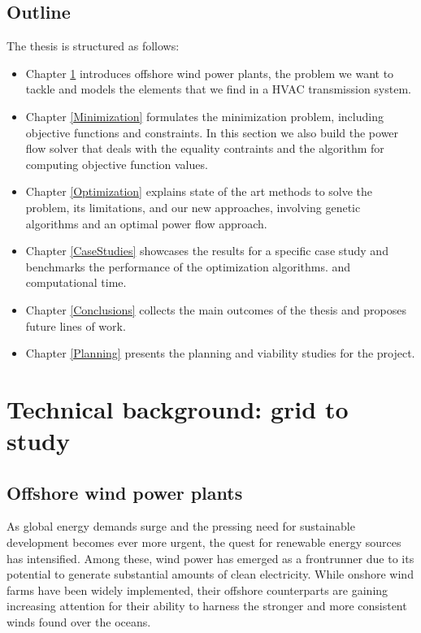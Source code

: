 \documentclass[a4paper,11pt, titlepage, twoside]{article}
\begin{document}
\newpage

\subsection{Outline}

The thesis is structured as follows:
\begin{itemize}
    \item Chapter \ref{Grid} introduces offshore wind power plants, the problem we want to tackle and models the elements that we find in a HVAC transmission system.
    \item Chapter \ref{Minimization}  formulates the minimization problem, including objective functions and constraints. In this section we also
    build the power flow solver that deals with the equality contraints and the algorithm for computing objective function values.
    \item Chapter \ref{Optimization} explains state of the art methods to solve the problem, its limitations, and our new approaches, involving
    genetic algorithms and  an optimal power flow approach.
    \item Chapter \ref{CaseStudies} showcases  the results for a specific case study and benchmarks the performance of the optimization algorithms.
    and computational time.
    \item Chapter \ref{Conclusions} collects the main outcomes of the thesis and proposes future lines of work.
    \item Chapter \ref{Planning} presents the planning and viability studies for the project.
\end{itemize}
\section{Technical background: grid to study}\label{Grid}

\subsection{Offshore wind power plants}
As global energy demands surge and the pressing need for sustainable development becomes ever more urgent, 
the quest for renewable energy sources has intensified. Among these, wind power has emerged as a frontrunner due to its potential to generate substantial amounts of clean electricity.
While onshore wind farms have been widely implemented, their offshore counterparts are gaining increasing attention for their ability to harness the stronger and more consistent winds found over the oceans.\par
\end{document}
